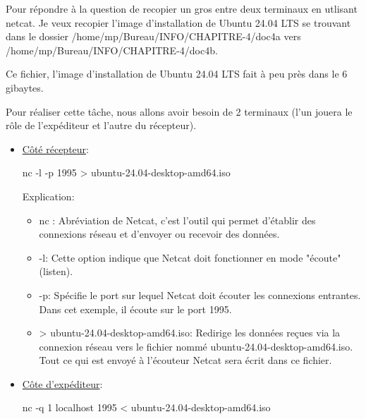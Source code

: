 \documentclass[a4paper,11pt]{article}
\begin{document}
            \bigskip
            \noindent Pour répondre à la question de recopier un gros entre deux terminaux en utlisant 
            netcat. Je veux recopier l'image d'installation de Ubuntu 24.04 LTS se trouvant dans le dossier 
            /home/mp/Bureau/INFO/CHAPITRE-4/doc4a vers /home/mp/Bureau/INFO/CHAPITRE-4/doc4b.

            \bigskip
            \noindent Ce fichier, l'image d'installation de Ubuntu 24.04 LTS fait à peu près dans le 6 gibaytes.
            
            \bigskip
            \noindent Pour réaliser cette tâche, nous allons avoir besoin de 2 terminaux (l'un jouera le rôle de l'expéditeur et l'autre du récepteur).

            \begin{itemize}
                \bigskip
                \item \underline{Côté récepteur}: 
                    \begin{tcolorbox}[colback=lightgray!6, colframe=black, left=5mm, right=5mm, top=2mm, bottom=2mm, boxrule=0.1mm]
                        nc -l -p 1995 > ubuntu-24.04-desktop-amd64.iso
                    \end{tcolorbox}

                    \noindent Explication:
                    \begin{itemize}
                        \item nc : Abréviation de Netcat, c'est l'outil qui permet d'établir des connexions réseau et d'envoyer ou recevoir des données.
                        \item -l: Cette option indique que Netcat doit fonctionner en mode "écoute" (listen). 
                        \item -p: Spécifie le port sur lequel Netcat doit écouter les connexions entrantes. Dans cet exemple, il écoute sur le port 1995.
                        \item > ubuntu-24.04-desktop-amd64.iso:  Redirige les données reçues via la connexion réseau vers le fichier nommé ubuntu-24.04-desktop-amd64.iso. 
                        Tout ce qui est envoyé à l'écouteur Netcat sera écrit dans ce fichier.
                    \end{itemize}
                
                \bigskip
                \item \underline{Côte d'expéditeur}:
                    \begin{tcolorbox}[colback=lightgray!6, colframe=black, left=5mm, right=5mm, top=2mm, bottom=2mm, boxrule=0.1mm]
                        nc -q 1 localhost 1995 < ubuntu-24.04-desktop-amd64.iso
                    \end{tcolorbox}
                    

\end{itemize}
\end{document}
